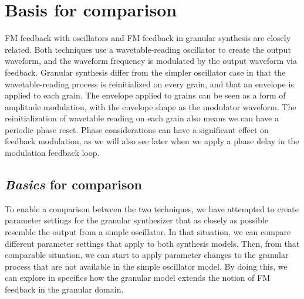 \documentclass[runningheads,a4paper]{llncs}
\begin{document}
\section{Basis for comparison}
FM feedback with oscillators and FM feedback in granular synthesis are closely related. Both techniques use a wavetable-reading oscillator to create the output waveform, and the waveform frequency is modulated by the output waveform via feedback. Granular synthesis differ from the simpler oscillator case in that the wavetable-reading process is reinitialized on every grain, and that an envelope is applied to each grain. The envelope applied to grains can be seen as a form of amplitude modulation, with the envelope shape as the modulator waveform. The reinitialization of wavetable reading on each grain also means we can have a periodic phase reset. Phase considerations can have a significant effect on feedback modulation, as we will also see later when we apply a phase delay in the modulation feedback loop.

\subsection{\emph{Basics} for comparison}
To enable a comparison between the two techniques, we have attempted to create parameter settings for the granular synthesizer that as closely as possible resemble the output from a simple oscillator. In that situation, we can compare different parameter settings that apply to both synthesis models. Then, from that comparable situation, we can start to apply parameter changes to the granular process that are not available in the simple oscillator model. By doing this, we can explore in specifics how the granular model extends the notion of FM feedback in the granular domain.
\end{document}
